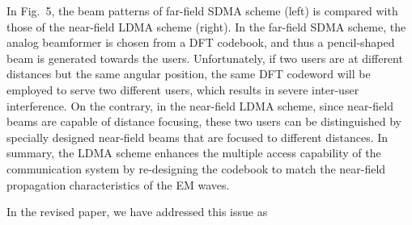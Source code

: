 \documentclass[a4paper,12pt]{article}
\begin{document}
{{\quad In Fig.~5, the beam patterns of far-field SDMA scheme (left) is compared with those of the near-field LDMA scheme (right). In the far-field SDMA scheme, the analog beamformer is chosen from a DFT codebook, and thus a pencil-shaped beam is generated towards the users. Unfortunately, if two users are at different distances but the same angular position, the same DFT codeword will be employed to serve two different users, which results in severe inter-user interference. 
On the contrary, in the near-field LDMA scheme, since near-field beams are capable of distance focusing, these two users can be distinguished by specially designed near-field beams that are focused to different distances. In summary, the LDMA scheme enhances the multiple access capability of the communication system by re-designing the codebook to match the near-field propagation characteristics of the EM waves. 





\quad In the revised paper, we have addressed this issue as 


}}
\end{document}
